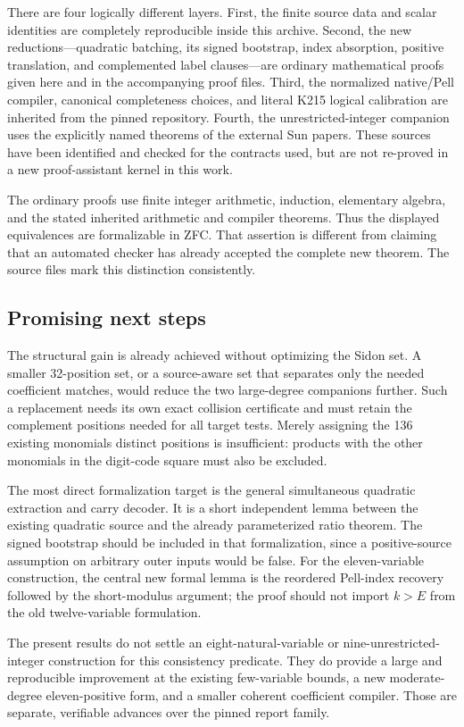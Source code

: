 There are four logically different layers.
First, the finite source data and scalar identities are completely
reproducible inside this archive. Second, the new reductions---quadratic
batching, its signed bootstrap, index absorption, positive translation,
and complemented label clauses---are ordinary mathematical proofs
given here and in the accompanying proof files. Third, the normalized
native/Pell compiler, canonical completeness choices, and literal K215
logical calibration are inherited from the pinned repository.
Fourth, the unrestricted-integer companion uses the explicitly named
theorems of the external Sun papers. These sources have been identified
and checked for the contracts used, but are not re-proved in a new
proof-assistant kernel in this work.

The ordinary proofs use finite integer arithmetic, induction,
elementary algebra, and the stated inherited arithmetic and compiler
theorems. Thus the displayed equivalences are formalizable in ZFC.
That assertion is different from claiming that an automated checker
has already accepted the complete new theorem. The source files mark
this distinction consistently.

\subsection{Promising next steps}

The structural gain is already achieved without optimizing the Sidon
set. A smaller 32-position set, or a source-aware set that separates
only the needed coefficient matches, would reduce the two large-degree
companions further. Such a replacement needs its own exact collision
certificate and must retain the complement positions needed for all
target tests. Merely assigning the 136 existing monomials distinct
positions is insufficient: products with the other monomials in the
digit-code square must also be excluded.

The most direct formalization target is the general simultaneous
quadratic extraction and carry decoder. It is a short independent
lemma between the existing quadratic source and the already
parameterized ratio theorem. The signed bootstrap should be included
in that formalization, since a positive-source assumption on arbitrary
outer inputs would be false. For the eleven-variable construction,
the central new formal lemma is the reordered Pell-index recovery
followed by the short-modulus argument; the proof should not import
$k>E$ from the old twelve-variable formulation.

The present results do not settle an eight-natural-variable or
nine-unrestricted-integer construction for this consistency predicate.
They do provide a large and reproducible improvement at the existing
few-variable bounds, a new moderate-degree eleven-positive form, and
a smaller coherent coefficient compiler. Those are separate,
verifiable advances over the pinned report family.
